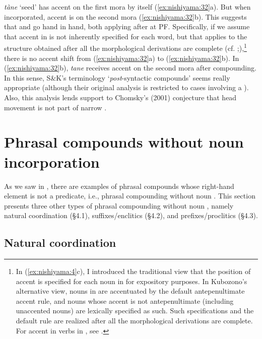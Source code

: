 \documentclass[output=paper]{LSP/langsci}
\begin{document}
\textit{tàne} ‘seed’ has accent on the first mora by itself (\ref{ex:nishiyama:32}a). But when incorporated, accent is on the second mora (\ref{ex:nishiyama:32}b). This suggests that  and  go hand in hand, both applying after  at PF. Specifically, if we assume that accent in  is not inherently specified for each word, but that  applies to the structure obtained after all the morphological derivations are complete (cf. \citealt{Kubozono2008};\citealt{Nishiyama2010}),\footnote{In (\ref{ex:nishiyama:4}c), I introduced the traditional view that the position of accent is specified for each noun in  for expository purposes. In Kubozono's \citeyear{Kubozono2008} alternative view, nouns in  are accentuated by the default antepenultimate accent rule, and nouns whose accent is not antepenultimate (including unaccented nouns) are lexically specified as such. Such specifications and the default rule are realized after all the morphological derivations are complete. For accent in verbs in , see \citet{Nishiyama2010}.} there is no accent shift from (\ref{ex:nishiyama:32}a) to (\ref{ex:nishiyama:32}b). In (\ref{ex:nishiyama:32}b), \textit{tane} receives accent on the second mora after compounding. In this sense, S\&K’s terminology ‘\textit{post}{}-syntactic compounds’ seems really appropriate (although their original analysis is restricted to cases involving a  ). Also, this analysis lends support to Chomsky’s (2001) \citeyear{Chomsky2001} conjecture that head movement is not part of narrow .

\section{Phrasal compounds without noun incorporation}\label{sec:nishiyama:4}
   

As we saw in , there are examples of phrasal compounds whose right-hand element is not a predicate, i.e., phrasal compounding without noun . This section presents three other types of phrasal compounding without noun , namely natural coordination (§4.1), suffixes/enclitics (§4.2), and prefixes/proclitics (§4.3).

\subsection{Natural coordination}\label{sec:nishiyama:4.1}
    
\end{document}
